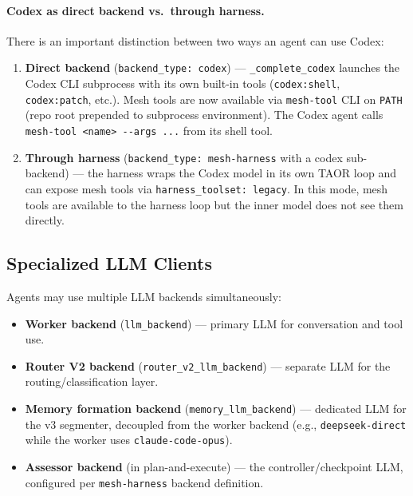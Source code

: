 \documentclass[11pt,a4paper]{article}
\newcommand{\code}[1]{\texttt{#1}}
\begin{document}
\paragraph{Codex as direct backend vs.\ through harness.}
There is an important distinction between two ways an agent can use
Codex:
\begin{enumerate}[nosep]
  \item \textbf{Direct backend} (\code{backend\_type: codex}) ---
        \code{\_complete\_codex} launches the Codex CLI subprocess with
        its own built-in tools (\code{codex:shell}, \code{codex:patch},
        etc.).  Mesh tools are now available via \code{mesh-tool} CLI
        on \code{PATH} (repo root prepended to subprocess environment).
        The Codex agent calls \code{mesh-tool <name> -{}-args ...} from
        its shell tool.
  \item \textbf{Through harness} (\code{backend\_type: mesh-harness}
        with a codex sub-backend) --- the harness wraps the Codex model
        in its own TAOR loop and can expose mesh tools via
        \code{harness\_toolset: legacy}.  In this mode, mesh tools are
        available to the harness loop but the inner model does not see
        them directly.
\end{enumerate}

\subsection{Specialized LLM Clients}

Agents may use multiple LLM backends simultaneously:
\begin{itemize}[nosep]
  \item \textbf{Worker backend} (\code{llm\_backend}) ---
        primary LLM for conversation and tool use.
  \item \textbf{Router V2 backend} (\code{router\_v2\_llm\_backend}) ---
        separate LLM for the routing/classification layer.
  \item \textbf{Memory formation backend}
        (\code{memory\_llm\_backend}) --- dedicated LLM for the v3
        segmenter, decoupled from the worker backend (e.g.,
        \code{deepseek-direct} while the worker uses
        \code{claude-code-opus}).
  \item \textbf{Assessor backend} (in plan-and-execute) ---
        the controller/checkpoint LLM, configured per
        \code{mesh-harness} backend definition.
\end{itemize}
\end{document}

